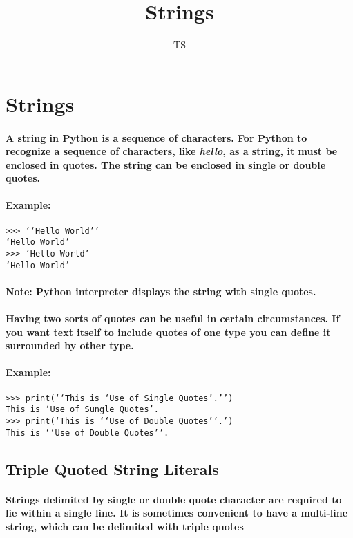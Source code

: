 \documentclass{book}
\title{Strings}
\date{}
\author{TS}
\begin{document}
\section*{Strings}

\hrulefill

\paragraph{
A string in Python is a sequence of characters. For Python to recognize a sequence of characters, like \textit{hello}, as a string, it must be enclosed in quotes. The string can be enclosed in single or double quotes. }

\paragraph{Example: }

\begin{verbatim}
>>> ‘‘Hello World’’ 
‘Hello World’ 
>>> ‘Hello World’ 
‘Hello World’ 
\end{verbatim}

\paragraph{Note: Python interpreter displays the string with single quotes.}

\paragraph{Having two sorts of quotes can be useful in certain circumstances. If you want text itself to include quotes of one type you can define it surrounded by other type. }

\paragraph{Example: }

\begin{verbatim}
>>> print(‘‘This is ‘Use of Single Quotes’.’’) 
This is ‘Use of Sungle Quotes’. 
>>> print(‘This is ‘‘Use of Double Quotes’’.’) 
This is ‘‘Use of Double Quotes’’. 
\end{verbatim}

\subsection*{Triple Quoted String Literals}

\paragraph{
Strings delimited by single or double quote character are required to lie within a single line. It is sometimes convenient to have a multi-line string, which can be delimited with triple quotes}
\end{document}
